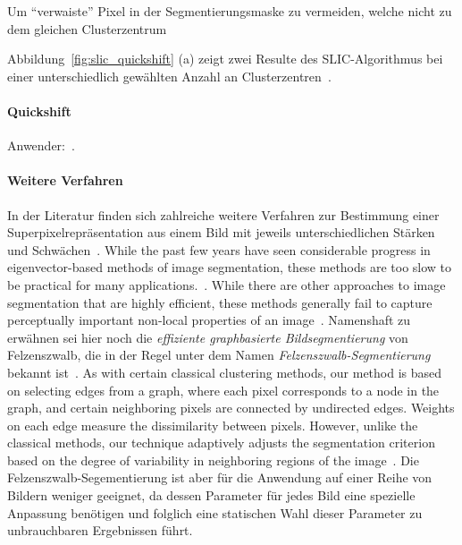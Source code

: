 Um \enquote{verwaiste} Pixel in der Segmentierungsmaske zu vermeiden, welche nicht zu dem gleichen Clusterzentrum

Abbildung~\ref{fig:slic_quickshift} (a) zeigt zwei Resulte des \gls{SLIC}-Algorithmus bei einer unterschiedlich gewählten Anzahl an Clusterzentren~\cite{slic}.

\paragraph{Quickshift}
\label{quickshift}

\cite{quickshift}
Anwender:~\cite{Fulkerson}.

\paragraph{Weitere Verfahren}
\label{weitere_superpixel_verfahren}

In der Literatur finden sich zahlreiche weitere Verfahren zur Bestimmung einer Superpixelrepräsentation aus einem Bild mit jeweils unterschiedlichen Stärken und Schwächen~\cite{super, slic}.
While the past few years have seen considerable progress in eigenvector-based
methods of image segmentation, these methods are too slow to be
practical for many applications.~\cite{felzenszwalb}.
While there are other approaches to image segmentation that are highly efficient, these
methods generally fail to capture perceptually important non-local properties of an
image~\cite{felzenszwalb}.
Namenshaft zu erwähnen sei hier noch die \emph{effiziente graphbasierte Bildsegmentierung} von Felzenszwalb, die in der Regel unter dem Namen \emph{Felzenszwalb-Segmentierung} bekannt ist~\cite{felzenszwalb}.
As with certain classical clustering methods, our method is based on
selecting edges from a graph, where each pixel corresponds to a node in the graph,
and certain neighboring pixels are connected by undirected edges. Weights on each
edge measure the dissimilarity between pixels. However, unlike the classical methods,
our technique adaptively adjusts the segmentation criterion based on the degree of
variability in neighboring regions of the image~\cite{felzenszwalb}.
Die Felzenszwalb-Segementierung ist aber für die Anwendung auf einer Reihe von Bildern weniger geeignet, da dessen Parameter für jedes Bild eine spezielle Anpassung benötigen und folglich eine statischen Wahl dieser Parameter zu unbrauchbaren Ergebnissen führt.
